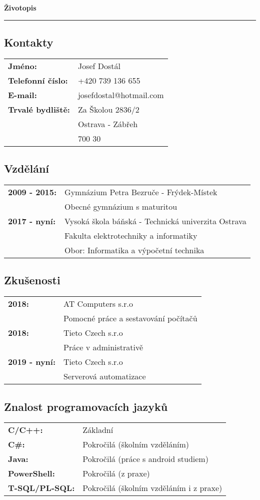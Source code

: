 \documentclass[a4paper]{article}
\begin{document}
\begin{center}
	\huge{\textbf{Životopis}}
	\par\noindent\rule{\textwidth}{0.4pt}
\end{center}

\subsection*{Kontakty}
\begin{tabular}{>{\bfseries}l l}
	Jméno: & Josef Dostál \\
	Telefonní číslo: & +420 739 136 655 \\
	E-mail: & josefdostal@hotmail.com \\
	Trvalé bydliště: & Za Školou 2836/2 \\
					 & Ostrava - Zábřeh \\
					 & 700 30
\end{tabular}

\subsection*{Vzdělání}
\begin{tabular}{>{\bfseries}l l}
	2009 - 2015: & Gymnázium Petra Bezruče - Frýdek-Místek \\
				 & Obecné gymnázium s maturitou \\
	2017 - nyní: & Vysoká škola báňská - Technická univerzita Ostrava \\
				 & Fakulta elektrotechniky a informatiky \\
				 & Obor: Informatika a výpočetní technika \\
\end{tabular}

\subsection*{Zkušenosti}
\begin{tabular}{>{\bfseries}l l}
	2018: & AT Computers s.r.o \\
		  & Pomocné práce a sestavování počítačů \\
	2018: & Tieto Czech s.r.o \\
		  & Práce v administrativě \\
	2019 - nyní: & Tieto Czech s.r.o \\
				 & Serverová automatizace
\end{tabular}

\subsection*{Znalost programovacích jazyků}
\begin{tabular}{>{\bfseries}l l}
	C/C++: & Základní \\
	C\#: & Pokročilá (školním vzděláním) \\
	Java: & Pokročilá (práce s android studiem) \\
	PowerShell: & Pokročilá (z praxe) \\
	T-SQL/PL-SQL: & Pokročilá (školním vzděláním i z praxe) \\
\end{tabular}
\end{document}
